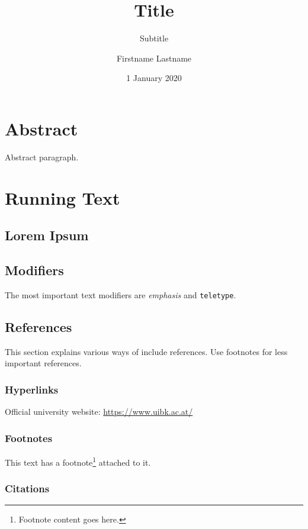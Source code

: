 \documentclass[parskip=half]{scrbook}
\title{Title}
\subtitle{Subtitle}
\author{Firstname Lastname}
\date{1 January 2020}
\begin{document}
\frontmatter
\maketitle
\tableofcontents

\chapter*{Abstract}

Abstract paragraph.

\mainmatter

\chapter{Running Text}

\section{Lorem Ipsum}

\lipsum[1-2]

\section{Modifiers}

The most important text modifiers are \emph{emphasis} and \texttt{teletype}.

\section{References}

This section explains various ways of include references.
Use footnotes for less important references.

\subsection{Hyperlinks}

Official university website: \url{https://www.uibk.ac.at/}

\subsection{Footnotes}

This text has a footnote\footnote{Footnote content goes here.} attached to it.

\subsection{Citations}
\end{document}
